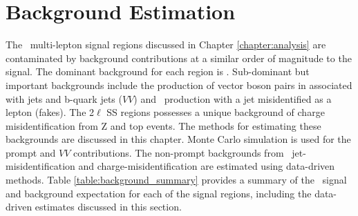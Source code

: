 \chapter[Background Estimation][Background Estimation]{Background Estimation}
\label{chapter:background}

The \tth\ multi-lepton signal regions discussed in Chapter \ref{chapter:analysis} are contaminated by background contributions at a similar order of magnitude to the signal. The dominant background for each region is \ttV. Sub-dominant but important backgrounds include the production of vector boson pairs in associated with jets and b-quark jets ($VV$) and \ttbar\ production with a jet misidentified as a lepton (fakes). The 2$\ell$ SS regions possesses a unique background of charge misidentification from Z and top events. The methods for estimating these backgrounds are discussed in this chapter. Monte Carlo simulation is used for the prompt \ttV and $VV$ contributions. The non-prompt backgrounds from \ttbar\ jet-misidentification and charge-misidentification are estimated using data-driven methods. Table \ref{table:background_summary} provides a summary of the \tth\ signal and background expectation for each of the signal regions, including the data-driven estimates discussed in this section.


